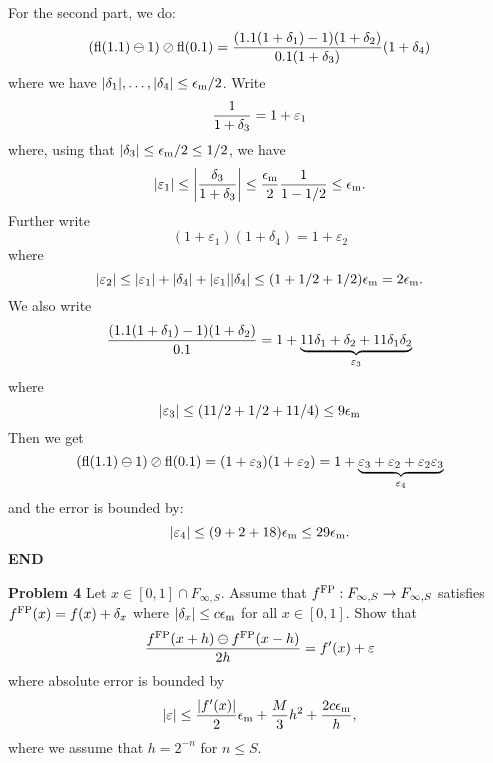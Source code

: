 \documentclass[12pt,a4paper]{article}
\begin{document}
For the second part, we do:
\[
({\rm fl}(1.1) \ensuremath{\ominus} 1) \ensuremath{\oslash} {\rm fl}(0.1) = {(1.1 (1 + \ensuremath{\delta}_1) - 1)(1 + \ensuremath{\delta}_2) \over 0.1 (1 + \ensuremath{\delta}_3)} (1 + \ensuremath{\delta}_4)
\]
where we have $|\ensuremath{\delta}_1|,\ensuremath{\ldots},|\ensuremath{\delta}_4| \ensuremath{\leq} \ensuremath{\epsilon}_{\rm m}/2$. Write
\[
{1 \over 1 + \ensuremath{\delta}_3} = 1 + \ensuremath{\varepsilon}_1
\]
where, using that $|\ensuremath{\delta}_3| \ensuremath{\leq} \ensuremath{\epsilon}_{\rm m}/2 \ensuremath{\leq} 1/2$, we have
\[
|\ensuremath{\varepsilon}_1| \ensuremath{\leq} \left| {\ensuremath{\delta}_3 \over 1 + \ensuremath{\delta}_3} \right| \ensuremath{\leq}  {\ensuremath{\epsilon}_{\rm m} \over 2} {1 \over 1 - 1/2} \ensuremath{\leq} \ensuremath{\epsilon}_{\rm m}.
\]
Further write
\[
(1 + \ensuremath{\varepsilon}_1)(1 + \ensuremath{\delta}_4) = 1 + \ensuremath{\varepsilon}_2
\]
where
\[
|\ensuremath{\varepsilon}_2| \ensuremath{\leq} |\ensuremath{\varepsilon}_1| + |\ensuremath{\delta}_4| + |\ensuremath{\varepsilon}_1| |\ensuremath{\delta}_4| \ensuremath{\leq} (1 + 1/2 + 1/2) \ensuremath{\epsilon}_{\rm m} =   2\ensuremath{\epsilon}_{\rm m}.
\]
We also write
\[
{(1.1 (1 + \ensuremath{\delta}_1) - 1)(1 + \ensuremath{\delta}_2) \over 0.1} = 1 + \underbrace{11\ensuremath{\delta}_1 + \ensuremath{\delta}_2 + 11\ensuremath{\delta}_1\ensuremath{\delta}_2}_{\ensuremath{\varepsilon}_3}
\]
where
\[
|\ensuremath{\varepsilon}_3| \ensuremath{\leq} (11/2 + 1/2  + 11/4) \ensuremath{\leq} 9 \ensuremath{\epsilon}_{\rm m}
\]
Then we get
\[
({\rm fl}(1.1) \ensuremath{\ominus} 1) \ensuremath{\oslash} {\rm fl}(0.1) = (1 + \ensuremath{\varepsilon}_3) (1 + \ensuremath{\varepsilon}_2) =  1 + \underbrace{\ensuremath{\varepsilon}_3 + \ensuremath{\varepsilon}_2 + \ensuremath{\varepsilon}_2 \ensuremath{\varepsilon}_3}_{\ensuremath{\varepsilon}_4}
\]
and the error is bounded by:
\[
|\ensuremath{\varepsilon}_4| \ensuremath{\leq} (9 + 2 + 18) \ensuremath{\epsilon}_{\rm m} \ensuremath{\leq} 29 \ensuremath{\epsilon}_{\rm m}.
\]
\textbf{END}

\textbf{Problem 4} Let $x \ensuremath{\in} [0,1] \ensuremath{\cap} F_{\ensuremath{\infty},S}$. Assume that $f^{\rm FP} : F_{\ensuremath{\infty},S} \ensuremath{\rightarrow} F_{\ensuremath{\infty},S}$ satisfies $f^{\rm FP}(x) = f(x) + \ensuremath{\delta}_x$ where $|\ensuremath{\delta}_x| \ensuremath{\leq} c \ensuremath{\epsilon}_{\rm m}$ for all $x \ensuremath{\in} [0,1]$. Show that
\[
{f^{\rm FP}(x+h) \ensuremath{\ominus} f^{\rm FP}(x-h) \over  2h} = f'(x) + \ensuremath{\varepsilon}
\]
where absolute error is bounded by
\[
|\ensuremath{\varepsilon}| \ensuremath{\leq} {|f'(x)| \over 2} \ensuremath{\epsilon}_{\rm m} + {M \over 3} h^2 + {2 c \ensuremath{\epsilon}_{\rm m} \over h},
\]
where we assume  that $h = 2^{-n}$ for $n \ensuremath{\leq} S$.
\end{document}
